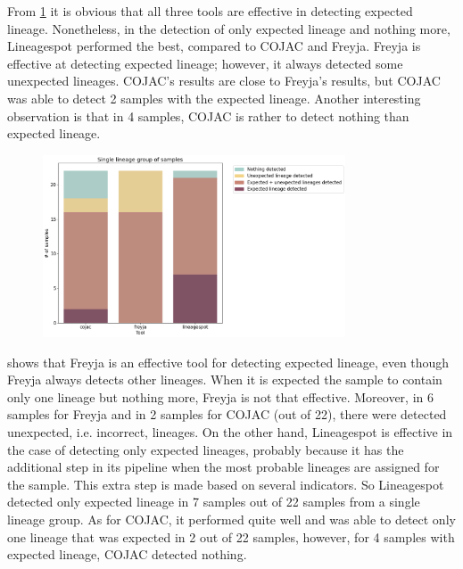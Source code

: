                 From \cref{fig:results:mock:bar-singlin} it is obvious that all three tools are effective in detecting expected lineage. Nonetheless, in the detection of only expected lineage and nothing more, Lineagespot performed the best, compared to COJAC and Freyja. Freyja is effective at detecting expected lineage; however, it always detected some unexpected lineages. COJAC's results are close to Freyja's results, but COJAC was able to detect 2 samples with the expected lineage. Another interesting observation is that in 4 samples, COJAC is rather to detect nothing than expected lineage. 
                \begin{figure}[ht!]
                	\centering
                    \includegraphics[width=0.8\textwidth]{figures/results/mock/singlin-num-bars.png}
                    \label{fig:results:mock:bar-singlin}
                \end{figure}
                 shows that Freyja is an effective tool for detecting expected lineage, even though Freyja always detects other lineages. When it is expected the sample to contain only one lineage but nothing more, Freyja is not that effective. Moreover, in 6 samples for Freyja and in 2 samples for COJAC (out of 22), there were detected unexpected, i.e. incorrect, lineages. On the other hand, Lineagespot is effective in the case of detecting only expected lineages, probably because it has the additional step in its pipeline when the most probable lineages are assigned for the sample. This extra step is made based on several indicators. So Lineagespot detected only expected lineage in 7 samples out of 22 samples from a single lineage group. As for COJAC, it performed quite well and was able to detect only one lineage that was expected in 2 out of 22 samples, however, for 4 samples with expected lineage, COJAC detected nothing.
                

